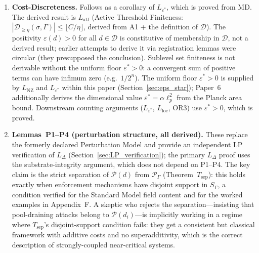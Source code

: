 \documentclass[11pt]{article}
\theoremstyle{remark}
\begin{document}
\begin{enumerate}
  \item \textbf{Cost-Discreteness.}  Follows as a corollary of $L_{\varepsilon^*}$, which is proved from MD.
    The derived result is $L_{\mathrm{atf}}$ (Active Threshold Finiteness:
    $|\mathcal{D}_{\ge\eta}(\sigma,\Gamma)| \le \lfloor C/\eta \rfloor$, derived from
    A1 + the definition of $\mathcal{D}$).  The positivity $\varepsilon(d) > 0$ for all
    $d \in \mathcal{D}$ is constitutive of membership in $\mathcal{D}$, not a derived
    result; earlier attempts to derive it via registration lemmas were circular (they
    presupposed the conclusion).  Sublevel set finiteness is not derivable without the
    uniform floor $\varepsilon^* > 0$: a convergent sum of positive terms can have
    infimum zero (e.g.\ $1/2^n$).  The uniform floor $\varepsilon^* > 0$ is supplied by $L_{\mathrm{NZ}}$ and $L_{\varepsilon^*}$ within this paper (Section~\ref{sec:eps_star});
    Paper~6 additionally derives the dimensional value $\varepsilon^* = \alpha\ell_p^2$ from the Planck area bound.  Downstream counting arguments
    ($L_{\varepsilon^*}$, $L_{\mathrm{loc}}$, OR3) use $\varepsilon^* > 0$, which is proved.

  \item \textbf{Lemmas~P1--P4 (perturbation structure, all derived).}  These replace the formerly declared Perturbation Model and provide an independent LP verification of $L_\Delta$ (Section~\ref{sec:LP_verification}); the primary $L_\Delta$ proof uses the substrate-integrity argument, which does not depend on P1--P4.  The key claim is the strict separation of $\mathcal{P}(d)$ from $\mathcal{P}_\Gamma$ (Theorem~$T_{\mathrm{sep}}$): this holds exactly when enforcement mechanisms have disjoint support in $S_\Gamma$, a condition verified for the Standard Model field content and for the worked examples in Appendix~F.  A skeptic who rejects the separation---insisting that pool-draining attacks belong to $\mathcal{P}(d_i)$---is implicitly working in a regime where $T_{\mathrm{sep}}$'s disjoint-support condition fails: they get a consistent but classical framework with additive costs and no superadditivity, which is the correct description of strongly-coupled near-critical systems.


\end{enumerate}
\end{document}
